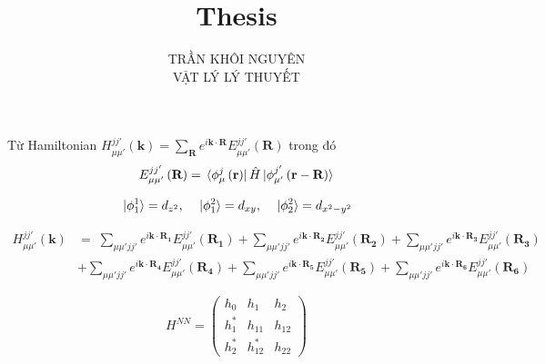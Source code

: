 \documentclass{article}
\title{\Huge{Thesis}}
\begin{document}
\setlength{\parindent}{20pt} \newpage \author{TRẦN KHÔI NGUYÊN \\ VẬT LÝ LÝ THUYẾT} \maketitle

\clearpage

Từ Hamiltonian $H^{jj'}_{\mu\mu'} \left( \mathbf{k}\right) = \sum_{\mathbf{R}}
	e^{i \mathbf{k\cdot R}} E^{jj'}_{\mu\mu'} \left(\textbf{R}\right) $ trong đó
\begin{align*}
	E^{jj'}_{\mu\mu'} \left(\textbf{R}\right) = \bra*{\phi^j_\mu \left(\textbf{r}\right)}\hat{H}\ket*{\phi^{j'}_{\mu'}\left(\textbf{r} - \textbf{R}\right)}
\end{align*}

\begin{align*}
	\ket*{\phi^1_1} = d_{z^2} , \quad \ket*{\phi^2_1} = d_{xy} , \quad \ket*{\phi^2_2} = d_{x^2 - y^2}
\end{align*}

\begin{align*}
	H^{jj'}_{\mu\mu'} \left( \mathbf{k}\right) & =  \; \sum_{\mu\mu' jj'} e^{i \mathbf{k\cdot R_1}} E^{jj'}_{\mu\mu'} \left(\mathbf{R_1}\right)
	+ \sum_{\mu\mu' jj'} e^{i \mathbf{k\cdot R_2}} E^{jj'}_{\mu\mu'} \left(\mathbf{R_2}\right)
	+ \sum_{\mu\mu' jj'} e^{i \mathbf{k\cdot R_3}} E^{jj'}_{\mu\mu'} \left(\mathbf{R_3}\right)                                                  \\
	                                           & + \sum_{\mu\mu' jj'} e^{i \mathbf{k\cdot R_4}} E^{jj'}_{\mu\mu'} \left(\mathbf{R_4}\right)
	+ \sum_{\mu\mu' jj'} e^{i \mathbf{k\cdot R_5}} E^{jj'}_{\mu\mu'} \left(\mathbf{R_5}\right)
	+ \sum_{\mu\mu' jj'} e^{i \mathbf{k\cdot R_6}} E^{jj'}_{\mu\mu'} \left(\mathbf{R_6}\right)
\end{align*}

\[
	\renewcommand{\arraystretch}{0.75}
	H^{NN} = \begin{pmatrix}
		h_{0}   & h_{1}    & h_{2}  \\
		h_{1}^* & h_{11}   & h_{12} \\
		h_{2}^* & h_{12}^* & h_{22}
	\end{pmatrix}
\]
\end{document}
